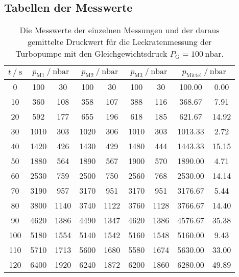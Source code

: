 \subsection{Tabellen der Messwerte}

\begin{table}[h]
    \centering
    \caption{Die Messwerte der einzelnen Messungen und der daraus gemittelte Druckwert für die Leckratenmessung der Turbopumpe mit den Gleichgewichtsdruck $P_\text{G} = \SI{100}{\nano\bar}$.}
    \label{tab:turbo_leck_1}
    \begin{tabular}{S[table-format=3.0] S @{${}\pm{}$} S S @{${}\pm{}$} S S @{${}\pm{}$} S S[table-format=4.2] @{${}\pm{}$} S[table-format=2.2]}
    \toprule
    {$t \mathbin{/} \si{\second} $} &  &  &  &  \\
       &  100 &   30 &  100 &   30 &  100 &   30 &  100.00 &  0.00 \\
    10  &  360 &  108 &  358 &  107 &  388 &  116 &  368.67 &  7.91 \\
    20  &  592 &  177 &  655 &  196 &  618 &  185 &  621.67 & 14.92 \\
    30  & 1010 &  303 & 1020 &  306 & 1010 &  303 & 1013.33 &  2.72 \\
    40  & 1420 &  426 & 1430 &  429 & 1480 &  444 & 1443.33 & 15.15 \\
    50  & 1880 &  564 & 1890 &  567 & 1900 &  570 & 1890.00 &  4.71 \\
    60  & 2530 &  759 & 2500 &  750 & 2560 &  768 & 2530.00 & 14.14 \\
    70  & 3190 &  957 & 3170 &  951 & 3170 &  951 & 3176.67 &  5.44 \\
    80  & 3800 & 1140 & 3740 & 1122 & 3760 & 1128 & 3766.67 & 14.40 \\
    90  & 4620 & 1386 & 4490 & 1347 & 4620 & 1386 & 4576.67 & 35.38 \\
    100 & 5180 & 1554 & 5140 & 1542 & 5160 & 1548 & 5160.00 &  9.43 \\
    110 & 5710 & 1713 & 5600 & 1680 & 5580 & 1674 & 5630.00 & 33.00 \\
    120 & 6400 & 1920 & 6240 & 1872 & 6200 & 1860 & 6280.00 & 49.89 \\
    \bottomrule
    \end{tabular}
  \end{table}

